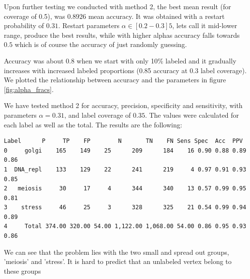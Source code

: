 Upon further testing we conducted with method 2,
the best mean result (for coverage of 0.5), was $0.8926$ mean accuracy.
It was obtained with a
restart probability of $0.31$. Restart parameters $\alpha \in [0.2-0.3]5$, lets
call it mid-lower range, produce the best results, while with higher
alphas accuracy falls towards $0.5$ which is of course the accuracy of
just randomly guessing. 

Accuracy was about 0.8 when we start with only 10\% labeled and it
gradually increases with increased labeled proportions (0.85 accuracy at
0.3 label coverage). We plotted the relationship between accuracy and
the parameters in figure \ref{fig:alpha_fracs}.

\begin{minipage}{\linewidth}
We have tested method 2 for accuracy, precision, specificity and
sensitivity, with parameters $\alpha = 0.31$, and label coverage of
$0.35$. The values were calculated for each label as well as the
total. The results are the following:

\begin{lstlisting}[basicstyle=\footnotesize, label=tab:sens]
      Label      P     TP    FP        N       TN    FN Sens Spec  Acc  PPV
0     golgi    165    149    25      209      184    16 0.90 0.88 0.89 0.86
1  DNA_repl    133    129    22      241      219     4 0.97 0.91 0.93 0.85
2   meiosis     30     17     4      344      340    13 0.57 0.99 0.95 0.81
3    stress     46     25     3      328      325    21 0.54 0.99 0.94 0.89
4     Total 374.00 320.00 54.00 1,122.00 1,068.00 54.00 0.86 0.95 0.93 0.86
\end{lstlisting}
\label{tab:senspec}

We can see that the problem lies with the two small and spread out
groups, 'meiosis' and 'stress'. It is hard to predict that an
unlabeled vertex belong to these groups 

\end{minipage}

